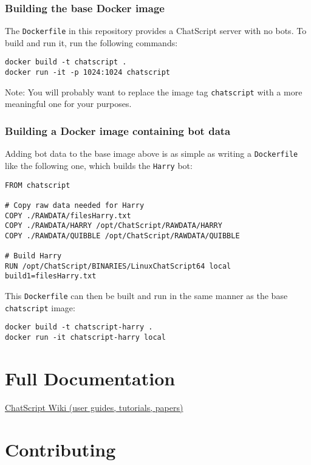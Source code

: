 \documentclass[]{article}
\begin{document}
\subsubsection{Building the base Docker
image}\label{building-the-base-docker-image}

The \texttt{Dockerfile} in this repository provides a ChatScript server
with no bots. To build and run it, run the following commands:

\begin{verbatim}
docker build -t chatscript .
docker run -it -p 1024:1024 chatscript
\end{verbatim}

Note: You will probably want to replace the image tag
\texttt{chatscript} with a more meaningful one for your purposes.

\subsubsection{Building a Docker image containing bot
data}\label{building-a-docker-image-containing-bot-data}

Adding bot data to the base image above is as simple as writing a
\texttt{Dockerfile} like the following one, which builds the
\texttt{Harry} bot:

\begin{verbatim}
FROM chatscript

# Copy raw data needed for Harry
COPY ./RAWDATA/filesHarry.txt
COPY ./RAWDATA/HARRY /opt/ChatScript/RAWDATA/HARRY
COPY ./RAWDATA/QUIBBLE /opt/ChatScript/RAWDATA/QUIBBLE

# Build Harry
RUN /opt/ChatScript/BINARIES/LinuxChatScript64 local build1=filesHarry.txt
\end{verbatim}

This \texttt{Dockerfile} can then be built and run in the same manner as
the base \texttt{chatscript} image:

\begin{verbatim}
docker build -t chatscript-harry .
docker run -it chatscript-harry local
\end{verbatim}

\section{Full Documentation}\label{full-documentation}

\href{/WIKI/README.md}{ChatScript Wiki (user guides, tutorials, papers)}

\section{Contributing}\label{contributing}
\end{document}
